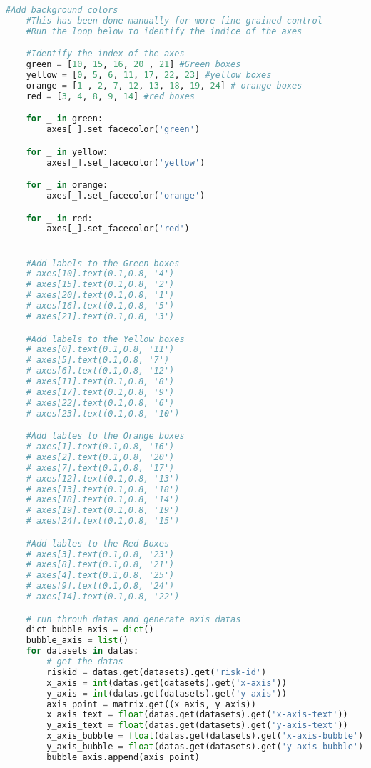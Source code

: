 \begin{lstlisting}[language=python, caption=Python LaTex - riskmatrix - Risxikomatrizen,captionpos=b,label={lst:riskmatrix},breaklines=true]
    #Add background colors
    #This has been done manually for more fine-grained control
    #Run the loop below to identify the indice of the axes

    #Identify the index of the axes
    green = [10, 15, 16, 20 , 21] #Green boxes
    yellow = [0, 5, 6, 11, 17, 22, 23] #yellow boxes
    orange = [1 , 2, 7, 12, 13, 18, 19, 24] # orange boxes
    red = [3, 4, 8, 9, 14] #red boxes

    for _ in green:
        axes[_].set_facecolor('green')

    for _ in yellow:
        axes[_].set_facecolor('yellow')

    for _ in orange:
        axes[_].set_facecolor('orange')

    for _ in red:
        axes[_].set_facecolor('red')


    #Add labels to the Green boxes
    # axes[10].text(0.1,0.8, '4')
    # axes[15].text(0.1,0.8, '2')
    # axes[20].text(0.1,0.8, '1')
    # axes[16].text(0.1,0.8, '5')
    # axes[21].text(0.1,0.8, '3')

    #Add labels to the Yellow boxes
    # axes[0].text(0.1,0.8, '11')
    # axes[5].text(0.1,0.8, '7')
    # axes[6].text(0.1,0.8, '12')
    # axes[11].text(0.1,0.8, '8')
    # axes[17].text(0.1,0.8, '9')
    # axes[22].text(0.1,0.8, '6')
    # axes[23].text(0.1,0.8, '10')

    #Add lables to the Orange boxes
    # axes[1].text(0.1,0.8, '16')
    # axes[2].text(0.1,0.8, '20')
    # axes[7].text(0.1,0.8, '17')
    # axes[12].text(0.1,0.8, '13')
    # axes[13].text(0.1,0.8, '18')
    # axes[18].text(0.1,0.8, '14')
    # axes[19].text(0.1,0.8, '19')
    # axes[24].text(0.1,0.8, '15')

    #Add lables to the Red Boxes
    # axes[3].text(0.1,0.8, '23')
    # axes[8].text(0.1,0.8, '21')
    # axes[4].text(0.1,0.8, '25')
    # axes[9].text(0.1,0.8, '24')
    # axes[14].text(0.1,0.8, '22')

    # run throuh datas and generate axis datas
    dict_bubble_axis = dict()
    bubble_axis = list()
    for datasets in datas:
        # get the datas
        riskid = datas.get(datasets).get('risk-id')
        x_axis = int(datas.get(datasets).get('x-axis'))
        y_axis = int(datas.get(datasets).get('y-axis'))
        axis_point = matrix.get((x_axis, y_axis))
        x_axis_text = float(datas.get(datasets).get('x-axis-text'))
        y_axis_text = float(datas.get(datasets).get('y-axis-text'))
        x_axis_bubble = float(datas.get(datasets).get('x-axis-bubble'))
        y_axis_bubble = float(datas.get(datasets).get('y-axis-bubble'))
        bubble_axis.append(axis_point)


\end{lstlisting}
